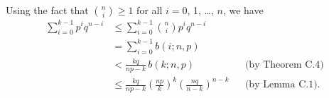 Using the fact that $\binom{n}{i}\ge1$ for all $i=0$, 1, \dots, $n$, we have
\begin{align*}
    \sum_{i=0}^{k-1}p^iq^{n-i} &\le \sum_{i=0}^{k-1}\binom{n}{i}p^iq^{n-i} \\
    &= \sum_{i=0}^{k-1}b(i;n,p) \\
    &< \frac{kq}{np-k}\,b(k;n,p) && \text{(by Theorem C.4)} \\
    &\le \frac{kq}{np-k}\left(\frac{np}{k}\right)^k\left(\frac{nq}{n-k}\right)^{n-k} && \text{(by Lemma C.1)}.
\end{align*}
